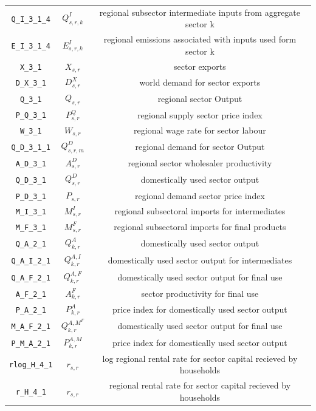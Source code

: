 \begin{center}
\begin{longtable}{ccc}
\texttt{Q\_I\_3\_1\_4} & ${Q^{I}_{s,r,k}}$ & regional subsector intermediate inputs from aggregate sector k\\
\texttt{E\_I\_3\_1\_4} & ${E^I_{s,r,k}}$ & regional emissions associated with inputs used form sector k\\
\texttt{X\_3\_1} & ${X_{s,r}}$ & sector exports\\
\texttt{D\_X\_3\_1} & ${D^{X}_{s,r}}$ & world demand for sector exports\\
\texttt{Q\_3\_1} & ${Q_{s,r}}$ & regional sector Output\\
\texttt{P\_Q\_3\_1} & ${P^Q_{s,r}}$ & regional supply sector price index\\
\texttt{W\_3\_1} & ${W_{s,r}}$ & regional wage rate for sector labour\\
\texttt{Q\_D\_3\_1\_1} & ${Q^D_{s,r,m}}$ & regional demand for sector Output\\
\texttt{A\_D\_3\_1} & ${A^{D}_{s,r}}$ & regional sector wholesaler productivity\\
\texttt{Q\_D\_3\_1} & ${Q^{D}_{s,r}}$ & domestically used sector output\\
\texttt{P\_D\_3\_1} & ${P_{s,r}}$ & regional demand sector price index\\
\texttt{M\_I\_3\_1} & ${M^I_{s,r}}$ & regional subsectoral imports for intermediates\\
\texttt{M\_F\_3\_1} & ${M^F_{s,r}}$ & regional subsectoral imports for final products\\
\texttt{Q\_A\_2\_1} & ${Q^{A}_{k,r}}$ & domestically used sector output\\
\texttt{Q\_A\_I\_2\_1} & ${Q^{A,I}_{k,r}}$ & domestically used sector output for intermediates\\
\texttt{Q\_A\_F\_2\_1} & ${Q^{A,F}_{k,r}}$ & domestically used sector output for final use\\
\texttt{A\_F\_2\_1} & ${A^{F}_{k,r}}$ & sector productivity for final use\\
\texttt{P\_A\_2\_1} & ${P^{A}_{k,r}}$ & price index for domestically used sector output\\
\texttt{M\_A\_F\_2\_1} & ${Q^{A,M^F}_{k,r}}$ & domestically used sector output for final use\\
\texttt{P\_M\_A\_2\_1} & ${P^{A,M}_{k,r}}$ & price index for domestically used sector output\\
\texttt{rlog\_H\_4\_1} & ${r_{s,r}}$ & log regional rental rate for sector capital recieved by households\\
\texttt{r\_H\_4\_1} & ${r_{s,r}}$ & regional rental rate for sector capital recieved by households\\

\end{longtable}
\end{center}
